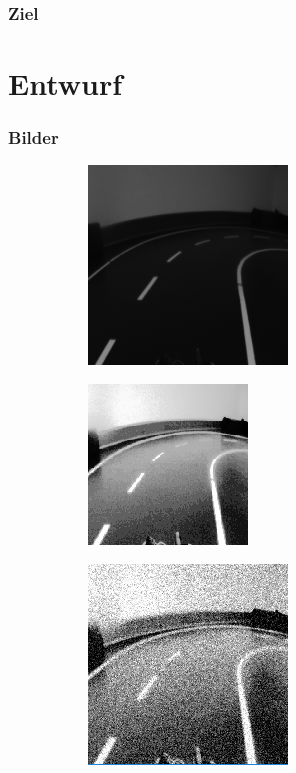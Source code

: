 \documentclass{beamer}
\begin{document}
\begin{frame}
\frametitle{Ziel}

\end{frame}


\section{Entwurf}
\frame{\tableofcontents[currentsection]}

\begin{frame}
\frametitle{Bilder}

\begin{figure}
\centering
	\begin{subfigure}{.25\textwidth}
		  \includegraphics[scale=0.32]{figures/200x200.png}
	\end{subfigure}%
	\begin{subfigure}{.25\textwidth}
		  \includegraphics[scale=0.4]{figures/200x200Hist.png}
	\end{subfigure}%
	\begin{subfigure}{.25\textwidth}
		  \includegraphics[scale=0.43]{figures/200x200Gauss.png}
	\end{subfigure}%
\end{figure}



\end{frame}
\end{document}
